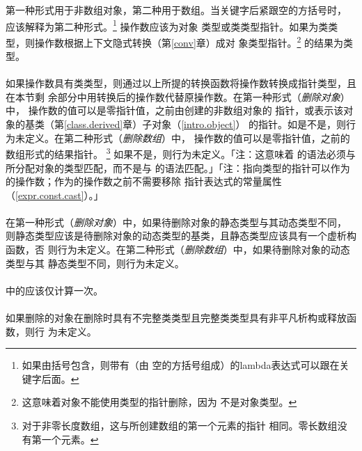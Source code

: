 
第一种形式用于非数组对象，第二种用于数组。当关键字后紧跟空的方括号时，
应该解释为第二种形式。\footnote{如果由括号包含，则带有（由
空的方括号组成）的lambda表达式可以跟在关键字后面。} 操作数应该为对象
类型或类类型指针。如果为类类型，则操作数根据上下文隐式转换（第\ref{conv}章）成对
象类型指针。\footnote{这意味着对象不能使用类型的指针删除，因为
不是对象类型。} 的结果为类型。

\paragraph{}
如果操作数具有类类型，则通过以上所提的转换函数将操作数转换成指针类型，且在本节剩
余部分中用转换后的操作数代替原操作数。在第一种形式（\textit{删除对象}）中，
操作数的值可以是零指针值，之前由创建的非数组对象的
指针，或表示该对象的基类（第\ref{class.derived}章）子对象（\ref{intro.object}）
的指针。如是不是，则行为未定义。在第二种形式（\textit{删除数组}）中，
操作数的值可以是零指针值，之前的数组形式的结果指针。
\footnote{对于非零长度数组，这与所创建数组的第一个元素的指针
相同。零长数组没有第一个元素。} 如果不是，则行为未定义。「注：这意味着
的语法必须与所分配对象的类型匹配，而不是与
的语法匹配。」「注：指向类型的指针可以作为
的操作数；作为的操作数之前不需要移除
指针表达式的常量属性（\ref{expr.const.cast}）。」

\paragraph{}
在第一种形式（\textit{删除对象}）中，如果待删除对象的静态类型与其动态类型不同，
则静态类型应该是待删除对象的动态类型的基类，且静态类型应该具有一个虚析构函数，否
则行为未定义。在第二种形式（\textit{删除数组}）中，如果待删除对象的动态类型与其
静态类型不同，则行为未定义。

\paragraph{}
中的应该仅计算一次。

\paragraph{}
如果删除的对象在删除时具有不完整类类型且完整类类型具有非平凡析构或释放函数，则行
为未定义。

